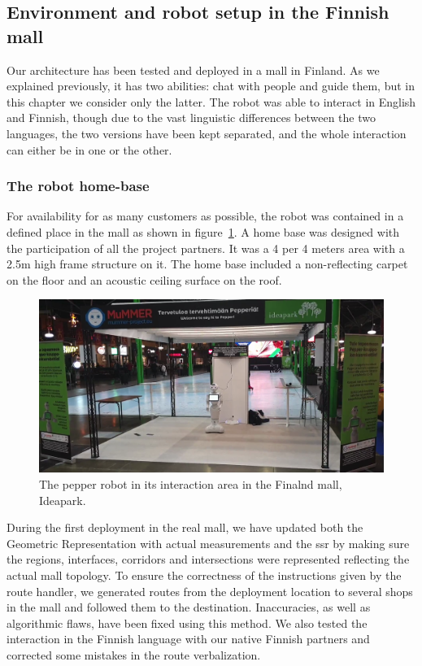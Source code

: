 \documentclass[a4paper,11pt,twoside]{StyleThese}
\begin{document}
\subsection{Environment and robot setup in the Finnish mall}\label{subsec:setup_mall}
Our architecture has been tested and deployed in a mall in Finland. As we explained previously, it has two abilities: chat with people and guide them, but in this chapter we consider only the latter. The robot was able to interact in English and Finnish, though due to the vast linguistic differences between the two languages, the two versions have been kept separated, and the whole interaction can either be in one or the other. 

\subsubsection{The robot home-base}\label{chap8:subsubsec:home}

For availability for as many customers as possible, the robot was contained in a defined place in the mall as shown in figure~\ref{fig:chap3_pepper_mall}. A home base was designed with the participation of all the project partners. It was a 4 per 4 meters area with a 2.5m high frame structure on it. The home base included a non-reflecting carpet on the floor and an acoustic ceiling surface on the roof.

\begin{figure}[ht!]
	\centering
	\includegraphics[scale=0.2]{figures/chapter3/pepper_mall.png}
	\caption{\label{fig:chap3_pepper_mall} The pepper robot in its interaction area in the Finalnd mall, Ideapark. }
\end{figure}

During the first deployment in the real mall, we have updated both the Geometric Representation with actual measurements and the \acrfull{ssr} by making sure the regions, interfaces, corridors and intersections were represented reflecting the actual mall topology. To ensure the correctness of the instructions given by the route handler, we generated routes from the deployment location to several shops in the mall and followed them to the destination. Inaccuracies, as well as algorithmic flaws, have been fixed using this method. We also tested the interaction in the Finnish language with our native Finnish partners and corrected some mistakes in the route verbalization.
\end{document}
